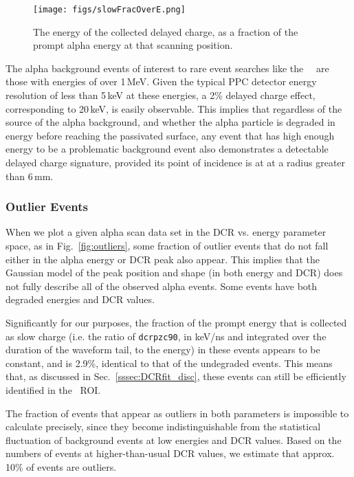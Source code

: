 \documentclass[groupedaddress,rmp,amsmath,amssymb,bibnotes,altaffilletter,twocolumn]{revtex4-1}
\begin{document}
\begin{figure}[]
 \centering
 \texttt{[image: figs/slowFracOverE.png]}
 \caption{The energy of the collected delayed charge, as a fraction of the prompt alpha energy at that scanning position.} 
 \label{fig:Efrac}
\end{figure}

The alpha background events of interest to rare event searches like the \MJ\ \DEM\ are those with energies of over 1\,MeV. Given the typical PPC detector energy resolution of less than 5\,keV at these energies, a 2\% delayed charge effect, corresponding to 20\,keV, is easily observable. This implies that regardless of the source of the alpha background, and whether the alpha particle is degraded in energy before reaching the passivated surface, any event that has high enough energy to be a problematic background event also demonstrates a detectable delayed charge signature, provided its point of incidence is at at a radius greater than 6\,mm. 

\subsubsection{Outlier Events}\label{sssec:outliers}
When we plot a given alpha scan data set in the DCR vs. energy parameter space, as in Fig.~\ref{fig:outliers}, some fraction of outlier events that do not fall either in the alpha energy or DCR peak also appear. This implies that the Gaussian model of the peak position and shape (in both energy and DCR) does not fully describe all of the observed alpha events. Some events have both degraded energies and DCR values. 

Significantly for our purposes, the fraction of the prompt energy that is collected as slow charge (i.e. the ratio of {\tt dcrpzc90}, in keV/ns and integrated over the duration of the waveform tail, to the energy) in these events appears to be constant, and is 2.9\%, identical to that of the undegraded events. This means that, as discussed in Sec.~\ref{sssec:DCRfit_disc}, these events can still be efficiently identified in the \nonubb\ ROI.

The fraction of events that appear as outliers in both parameters is impossible to calculate precisely, since they become indistinguishable from the statistical fluctuation of background events at low energies and DCR values. Based on the numbers of events at higher-than-usual DCR values, we estimate that approx. 10\% of events are outliers. 
\end{document}
